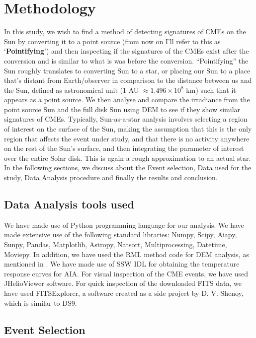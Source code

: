 \section{Methodology}

In this study, we wish to find a method of detecting signatures of CMEs on the Sun by converting it to a point source (from now on I'll refer to this as `\textbf{Pointifying}') and then inspecting if the signatures of the CMEs exist after the conversion and is similar to what is was before the conversion. ``Pointifying'' the Sun roughly translates to converting Sun to a star, or placing our Sun to a place that's distant from Earth/observer in comparison to the distance between us and the Sun, defined as astronomical unit (1 AU $\approx 1.496\times10^{8}$ km) such that it appears as a point source. We then analyse and compare the irradiance from the point source Sun and the full disk Sun using DEM to see if they show similar signatures of CMEs. Typically, Sun-as-a-star analysis involves selecting a region of interest on the surface of the Sun, making the assumption that this is the only region that affects the event under study, and that there is no activity anywhere on the rest of the Sun's surface, and then integrating the parameter of interest over the entire Solar disk. This is again a rough approximation to  an actual star.\\

\noindent In the following sections, we discuss about the Event selection, Data used for the study, Data Analysis procedure and finally the results and conclusion.

\subsection{Data Analysis tools used}

We have made use of Python programming language for our analysis. We have made extensive use of the following standard libraries: Numpy, Scipy, Aiapy, Sunpy, Pandas, Matplotlib, Astropy, Natsort, Multiprocessing, Datetime, Moviepy. In addition, we have used the RML method code for DEM analysis, as mentioned in \citep{Massa2023}. We have made use of SSW IDL for obtaining the temperature response curves for AIA. For visual inspection of the CME events, we have used JHelioViewer software. For quick inspection of the downloaded FITS data, we have used FITSExplorer, a software created as a side project by D. V. Shenoy, which is similar to DS9.

\subsection{Event Selection}

